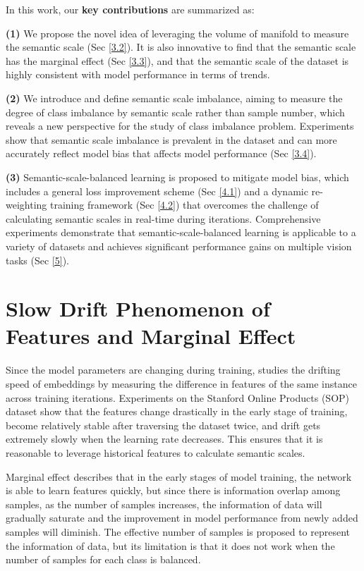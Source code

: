\documentclass[10pt]{article} %
\begin{document}
In this work, our \textbf{key contributions} are summarized as:


\textbf{(1)} We propose the novel idea of leveraging the volume of manifold to measure the semantic scale (Sec \ref{3.2}). It is also innovative to find that the semantic scale has the marginal effect (Sec \ref{3.3}), and that the semantic scale of the dataset is highly consistent with model performance in terms of trends.

\textbf{(2)} We introduce and define semantic scale imbalance, aiming to measure the degree of class imbalance by semantic scale rather than sample number, which reveals a new perspective for the study of class imbalance problem. Experiments show that semantic scale imbalance is prevalent in the dataset and can more accurately reflect model bias that affects model performance (Sec \ref{3.4}).

\textbf{(3)} Semantic-scale-balanced learning is proposed to mitigate model bias, which includes a general loss improvement scheme (Sec \ref{4.1}) and a dynamic re-weighting training framework (Sec \ref{4.2}) that overcomes the challenge of calculating semantic scales in real-time during iterations. Comprehensive experiments demonstrate that semantic-scale-balanced learning is applicable to a variety of datasets and achieves significant performance gains on multiple vision tasks (Sec \ref{5}).

\section{Slow Drift Phenomenon of Features and Marginal Effect\label{2}}


Since the model parameters are changing during training, \cite {paper25} studies the drifting speed of embeddings by measuring the difference in features of the same instance across training iterations. Experiments on the Stanford Online Products (SOP) dataset \cite {paper83} show that the features change drastically in the early stage of training, become relatively stable after traversing the dataset twice, and drift gets extremely slowly when the learning rate decreases. This ensures that it is reasonable to leverage historical features to calculate semantic scales.

Marginal effect \cite {paper14} describes that in the early stages of model training, the network is able to learn features quickly, but since there is information overlap among samples, as the number of samples increases, the information of data will gradually saturate and the improvement in model performance from newly added samples will diminish. The effective number of samples is proposed to represent the information of data, but its limitation is that it does not work when the number of samples for each class is balanced.
\end{document}
